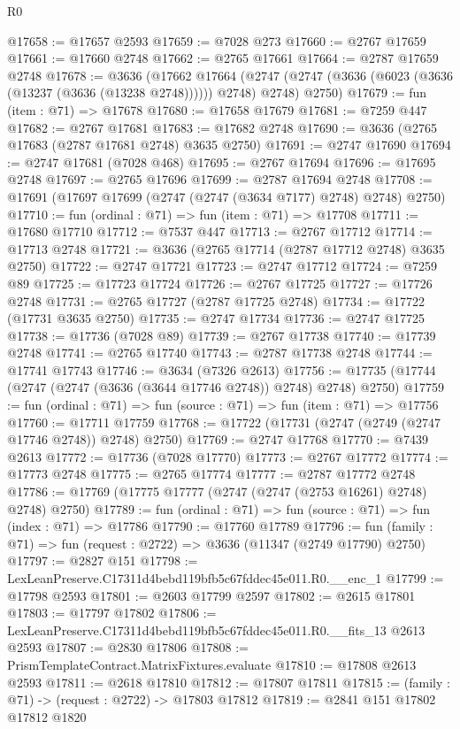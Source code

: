 \begin{lexlean}{R0}
\begin{coremodule}
@17658 := @17657 @2593
@17659 := @7028 @273
@17660 := @2767 @17659
@17661 := @17660 @2748
@17662 := @2765 @17661
@17664 := @2787 @17659 @2748
@17678 := @3636
    (@17662
      @17664
      (@2747 (@2747 (@3636 (@6023 (@3636 (@13237 (@3636 (@13238 @2748)))))) @2748) @2748)
      @2750)
@17679 := fun (item : @71) => @17678
@17680 := @17658 @17679
@17681 := @7259 @447
@17682 := @2767 @17681
@17683 := @17682 @2748
@17690 := @3636 (@2765 @17683 (@2787 @17681 @2748) @3635 @2750)
@17691 := @2747 @17690
@17694 := @2747 @17681 (@7028 @468)
@17695 := @2767 @17694
@17696 := @17695 @2748
@17697 := @2765 @17696
@17699 := @2787 @17694 @2748
@17708 := @17691 (@17697 @17699 (@2747 (@2747 (@3634 @7177) @2748) @2748) @2750)
@17710 := fun (ordinal : @71) => fun (item : @71) => @17708
@17711 := @17680 @17710
@17712 := @7537 @447
@17713 := @2767 @17712
@17714 := @17713 @2748
@17721 := @3636 (@2765 @17714 (@2787 @17712 @2748) @3635 @2750)
@17722 := @2747 @17721
@17723 := @2747 @17712
@17724 := @7259 @89
@17725 := @17723 @17724
@17726 := @2767 @17725
@17727 := @17726 @2748
@17731 := @2765 @17727 (@2787 @17725 @2748)
@17734 := @17722 (@17731 @3635 @2750)
@17735 := @2747 @17734
@17736 := @2747 @17725
@17738 := @17736 (@7028 @89)
@17739 := @2767 @17738
@17740 := @17739 @2748
@17741 := @2765 @17740
@17743 := @2787 @17738 @2748
@17744 := @17741 @17743
@17746 := @3634 (@7326 @2613)
@17756 := @17735 (@17744 (@2747 (@2747 (@3636 (@3644 @17746 @2748)) @2748) @2748) @2750)
@17759 := fun (ordinal : @71) => fun (source : @71) => fun (item : @71) => @17756
@17760 := @17711 @17759
@17768 := @17722 (@17731 (@2747 (@2749 (@2747 @17746 @2748)) @2748) @2750)
@17769 := @2747 @17768
@17770 := @7439 @2613
@17772 := @17736 (@7028 @17770)
@17773 := @2767 @17772
@17774 := @17773 @2748
@17775 := @2765 @17774
@17777 := @2787 @17772 @2748
@17786 := @17769 (@17775 @17777 (@2747 (@2747 (@2753 @16261) @2748) @2748) @2750)
@17789 := fun (ordinal : @71) => fun (source : @71) => fun (index : @71) => @17786
@17790 := @17760 @17789
@17796 := fun (family : @71) => fun (request : @2722) => @3636 (@11347 (@2749 @17790) @2750)
@17797 := @2827 @151
@17798 := LexLeanPreserve.C17311d4bebd119bfb5c67fddec45e011.R0.__enc_1
@17799 := @17798 @2593
@17801 := @2603 @17799 @2597
@17802 := @2615 @17801
@17803 := @17797 @17802
@17806 := LexLeanPreserve.C17311d4bebd119bfb5c67fddec45e011.R0.__fits_13 @2613 @2593
@17807 := @2830 @17806
@17808 := PrismTemplateContract.MatrixFixtures.evaluate
@17810 := @17808 @2613 @2593
@17811 := @2618 @17810
@17812 := @17807 @17811
@17815 := (family : @71) -> (request : @2722) -> @17803 @17812
@17819 := @2841 @151 @17802 @17812 @1820

\end{coremodule}
\end{lexlean}
